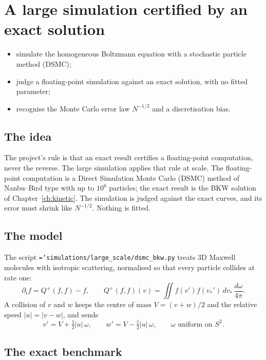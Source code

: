 \documentclass[11pt,a4paper,openany]{book}
\newcommand{\code}[1]{\texttt{\hyphenchar\font=`\-\relax #1}}
\theoremstyle{definition}
\theoremstyle{plain}
\begin{document}
\chapter{A large simulation certified by an exact solution}
\label{ch:simulation}

\begin{objectives}
\begin{itemize}
  \item simulate the homogeneous Boltzmann equation with a stochastic particle method (DSMC);
  \item judge a floating-point simulation against an exact solution, with no fitted parameter;
  \item recognise the Monte Carlo error law $N^{-1/2}$ and a discretisation bias.
\end{itemize}
\end{objectives}

\section{The idea}

The project's rule is that an exact result certifies a floating-point computation, never the
reverse. The large simulation applies that rule at scale. The floating-point computation is a
Direct Simulation Monte Carlo (DSMC) method of Nanbu--Bird type with up to $10^6$ particles; the
exact result is the BKW solution of Chapter~\ref{ch:kinetic}. The simulation is judged against the
exact curves, and its error must shrink like $N^{-1/2}$. Nothing is fitted.

\section{The model}

The script \code{simulations/large\_scale/dsmc\_bkw.py} treats 3D Maxwell molecules with
isotropic scattering, normalised so that every particle collides at rate one:
\[
  \partial_tf=Q^+(f,f)-f,\qquad
  Q^+(f,f)(v)=\iint f(v')f(v_*')\,dv_*\,\frac{d\omega}{4\pi}.
\]
A collision of $v$ and $w$ keeps the centre of mass $V=(v+w)/2$ and the relative speed
$|u|=|v-w|$, and sends
\[
  v'=V+\tfrac12|u|\,\omega,\qquad w'=V-\tfrac12|u|\,\omega,\qquad\omega\text{ uniform on }S^2.
\]

\section{The exact benchmark}
\end{document}
